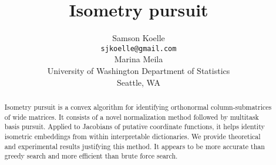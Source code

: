 \documentclass{article}
\title{Isometry pursuit}
\author{%
  Samson Koelle \\
  \texttt{sjkoelle@gmail.com} \\
  \And
  Marina Meila \\
  University of Washington Department of Statistics\\
  Seattle, WA \\
}
\begin{document}
\maketitle

\begin{abstract}
Isometry pursuit is a convex algorithm for identifying orthonormal column-submatrices of wide matrices.
It consists of a novel normalization method followed by multitask basis pursuit.
Applied to Jacobians of putative coordinate functions, it helps identity isometric embeddings from within interpretable dictionaries.
We provide theoretical and experimental results justifying this method.
It appears to be more accurate than greedy search and more efficient than brute force search.
\end{abstract}










\end{document}
